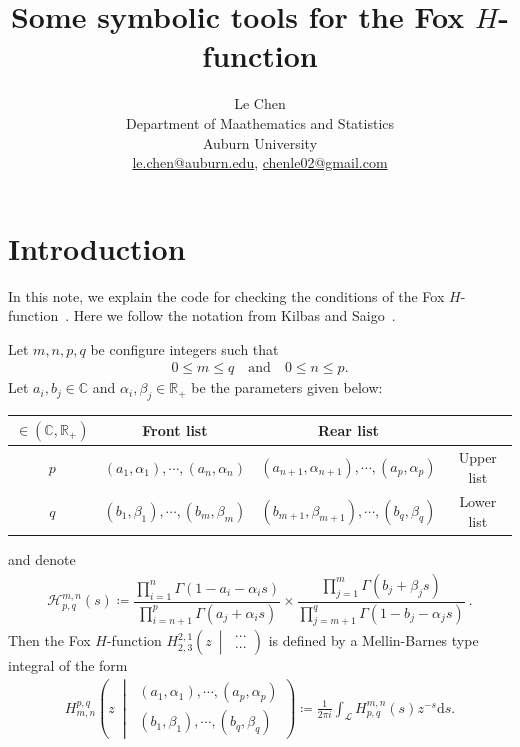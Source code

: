 \documentclass[11pt]{article}
\newcommand{\R}{\mathbb{R}}
\newcommand{\ud}{\ensuremath{\mathrm{d}}}
\newcommand{\FoxH}[5]{H_{#2}^{#1}\left(#3\:\middle\vert\: \begin{array}{l}#4\\[0.4em] #5\end{array}\right)}
\renewcommand{\arraystretch}{1.8}
\begin{document}
\title{Some symbolic tools for the {F}ox {$H$}-function}
\author{Le Chen                             \\
  Department of Maathematics and Statistics \\
  Auburn University                         \\
\url{le.chen@auburn.edu}, \url{chenle02@gmail.com}
}

\maketitle
\tableofcontents

\section{Introduction}
In this note, we explain the code for checking the conditions of the Fox
$H$-function~\cite{fox:61:g}. Here we follow the notation from Kilbas and
Saigo~\cite{kilbas.saigo:04:h-transforms}. \bigskip


Let $m,n,p,q$ be configure integers such that
\begin{align*}
  0 \le m \le q \quad \text{and} \quad
  0 \le n \le p.
\end{align*}
Let $a_i,b_j\in \mathbb{C}$ and $\alpha_i, \beta_j \in\R_+$ be the parameters given below:
\begin{center}
\renewcommand{\arraystretch}{1.2}
  \begin{tabular}{|c|cc|c|}
    \hline
    $\in \left(\mathbb{C},\R_+\right)$ & Front list                              & Rear list                                       &            \\ \hline
    $p$                                & $(a_1,\alpha_1),\cdots, (a_n,\alpha_n)$ & $(a_{n+1},\alpha_{n+1}),\cdots, (a_p,\alpha_p)$ & Upper list \\
    $q$                                & $(b_1,\beta_1),\cdots, (b_m,\beta_m)$   & $(b_{m+1},\beta_{m+1}),\cdots, (b_q,\beta_q)$   & Lower list \\ \hline
  \end{tabular}
\end{center}
and denote
\begin{align}\label{E:H}
  \mathcal{H}^{m,n}_{p,q}(s) \coloneqq
         \dfrac{ \displaystyle \prod_{i=1}^n\Gamma\left(1-a_i-\alpha_is\right) }{ \displaystyle \prod_{i=n+1}^p\Gamma\left(a_j+\alpha_is\right)    }
  \times \dfrac{ \displaystyle \prod_{j=1}^m\Gamma\left(b_j+\beta_js\right)    }{ \displaystyle \prod_{j=m+1}^q\Gamma\left(1- b_j-\alpha_js\right) }\:.
\end{align}
Then the Fox $H$-function $\FoxH{2,1}{2,3}{z}{\cdots}{\cdots}$ is defined by a Mellin-Barnes type integral of the form
\begin{align}\label{E:Fox-H}
  \FoxH{p,q}{m,n}{z}{(a_1,\alpha_1),\cdots, (a_p,\alpha_p)}{(b_1,\beta_1),\cdots, (b_q,\beta_q)}
  \coloneqq \frac{1}{2\pi i} \int_{\mathcal{L}} H^{m,n}_{p,q}(s) z^{-s} \ud s.
\end{align}
\end{document}
